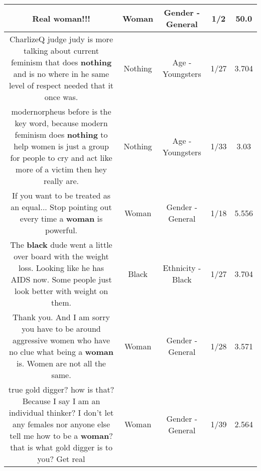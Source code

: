 \documentclass[11pt]{article}
\newlength\mylength
\begin{document}
\begin{center}
\begin{longtable}{|C{.65\mylength}|C{.30\mylength}|C{.12\mylength}|C{.12\mylength}|C{.12\mylength}|}
  \small Real \textbf{woman}!!!\normalsize   & Woman & Gender - General & 1/2 & 50.0 \\  \hline
  \small CharlizeQ judge judy is more talking about current feminism that does \textbf{nothing} and is no where in he same level of respect needed that it once was.\normalsize   & Nothing & Age - Youngsters & 1/27 & 3.704 \\  \hline
  \small modernorpheus before is the key word, because modern feminism does \textbf{nothing} to help women is just a group for people to cry and act like more of a victim then hey really are.\normalsize   & Nothing & Age - Youngsters & 1/33 & 3.03 \\  \hline
  \small If you want to be treated as an equal... Stop pointing out every time a \textbf{woman} is powerful.\normalsize   & Woman & Gender - General & 1/18 & 5.556 \\  \hline
  \small The \textbf{black} dude went a little over board with the weight loss. Looking like he has AIDS now. Some people just look better with weight on them.\normalsize   & Black & Ethnicity - Black & 1/27 & 3.704 \\  \hline
  \small Thank you. And I am sorry you have to be around aggressive women who have no clue what being a \textbf{woman} is. Women are not all the same.\normalsize   & Woman & Gender - General & 1/28 & 3.571 \\  \hline
  \small true gold digger? how is that? Because I say I am an individual thinker? I don't let any females nor anyone else tell me how to be a \textbf{woman}? that is what gold digger is to you? Get real\normalsize   & Woman & Gender - General & 1/39 & 2.564 \\  \hline

\end{longtable}
\end{center}
\end{document}
